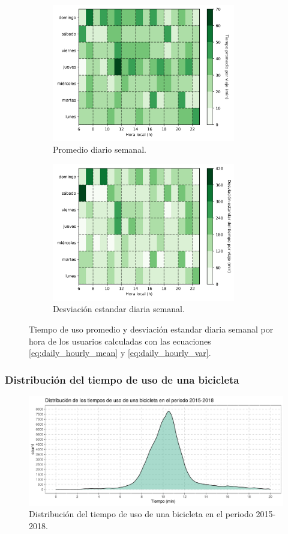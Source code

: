 \begin{figure}[H]
    \centering
    \begin{subfigure}[b]{8cm}
        \includegraphics[width=8cm]{Graphics/daily_hourly_mean_time_travel.png}
        \caption{Promedio diario semanal.}
        \label{fig:daily_hourly_mean_time}
    \end{subfigure}
    \begin{subfigure}[b]{8cm}
        \includegraphics[width=8cm]{Graphics/daily_hourly_var_time_travel.png}
        \caption{Desviación estandar diaria semanal.}
        \label{fig:daily_hourly_var_time}
    \end{subfigure}
    \caption{Tiempo de uso promedio y desviación estandar diaria semanal por hora de los usuarios calculadas con las ecuaciones \ref{eq:daily_hourly_mean} y \ref{eq:daily_hourly_var}.}
    \label{fig:daily_hourly_time}
\end{figure}

\subsubsection{Distribución del tiempo de uso de una bicicleta}

\begin{figure}[H]
    \centering
    \includegraphics[width=16cm]{Graphics/distribution_time_travel.png}
    \caption{Distribución del tiempo de uso de una bicicleta en el periodo 2015-2018.}
    \label{fig:distribution_times}
\end{figure}